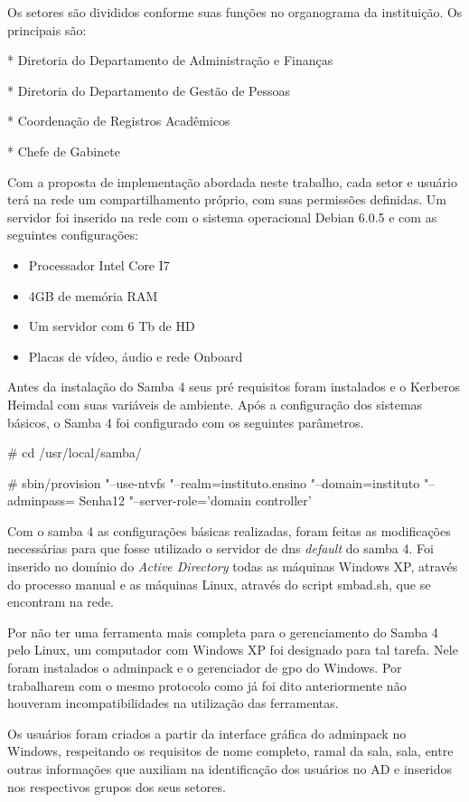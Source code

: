 Os setores são divididos conforme suas funções no organograma da instituição. Os principais são:

* Diretoria do Departamento de Administração e Finanças

* Diretoria do Departamento de Gestão de Pessoas

* Coordenação de Registros Acadêmicos

* Chefe de Gabinete

Com a proposta de implementação abordada neste trabalho, cada setor e usuário terá na rede um compartilhamento próprio, com suas permissões definidas. Um servidor foi inserido na rede com o sistema operacional Debian 6.0.5 e com as seguintes configurações:

\begin{itemize}
	\item{Processador Intel Core I7\textregistered}
	\item{4GB de memória RAM}
	\item{Um servidor com 6 Tb de HD}
	\item{Placas de vídeo, áudio e rede Onboard}
\end{itemize}

Antes da instalação do Samba 4 seus pré requisitos foram instalados e o Kerberos Heimdal com suas variáveis de ambiente.
Após a configuração dos sistemas básicos, o Samba 4 foi configurado com os seguintes parâmetros.

\# cd /usr/local/samba/

\# sbin/provision "--use-ntvfs "--realm=instituto.ensino "--domain=instituto "--adminpass= Senha12 "--server-role=’domain controller’

Com o samba 4 as configurações básicas realizadas, foram feitas as modificações necessárias para que fosse utilizado o servidor de dns \textit{default} do samba 4. Foi inserido no domínio do \textit{Active Directory} todas as máquinas Windows XP, através do processo manual e as máquinas Linux, através do script smbad.sh, que se encontram na rede.

Por não ter uma ferramenta mais completa para o gerenciamento do Samba 4 pelo Linux, um computador com Windows XP foi designado para tal tarefa. Nele foram instalados o adminpack e o gerenciador de gpo do Windows. Por trabalharem com o mesmo protocolo como já foi dito anteriormente não houveram incompatibilidades na utilização das ferramentas.

Os usuários foram criados a partir da interface gráfica do adminpack no Windows, respeitando os requisitos de nome completo, ramal da sala, sala, entre outras informações que auxiliam na identificação dos usuários no AD e inseridos nos respectivos grupos dos seus setores.

